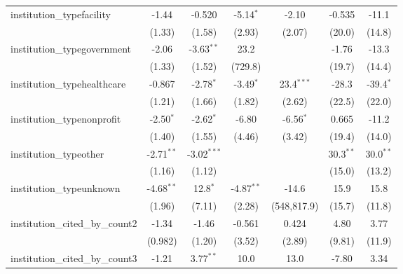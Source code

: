 \begin{tabular}{lcccccc}
   institution\_typefacility             & -1.44         & -0.520        & -5.14$^{*}$   & -2.10         & -0.535        & -11.1\\   
                                         & (1.33)        & (1.58)        & (2.93)        & (2.07)        & (20.0)        & (14.8)\\   
   institution\_typegovernment           & -2.06         & -3.63$^{**}$  & 23.2          &               & -1.76         & -13.3\\   
                                         & (1.33)        & (1.52)        & (729.8)       &               & (19.7)        & (14.4)\\   
   institution\_typehealthcare           & -0.867        & -2.78$^{*}$   & -3.49$^{*}$   & 23.4$^{***}$  & -28.3         & -39.4$^{*}$\\   
                                         & (1.21)        & (1.66)        & (1.82)        & (2.62)        & (22.5)        & (22.0)\\   
   institution\_typenonprofit            & -2.50$^{*}$   & -2.62$^{*}$   & -6.80         & -6.56$^{*}$   & 0.665         & -11.2\\   
                                         & (1.40)        & (1.55)        & (4.46)        & (3.42)        & (19.4)        & (14.0)\\   
   institution\_typeother                & -2.71$^{**}$  & -3.02$^{***}$ &               &               & 30.3$^{**}$   & 30.0$^{**}$\\   
                                         & (1.16)        & (1.12)        &               &               & (15.0)        & (13.2)\\   
   institution\_typeunknown              & -4.68$^{**}$  & 12.8$^{*}$    & -4.87$^{**}$  & -14.6         & 15.9          & 15.8\\   
                                         & (1.96)        & (7.11)        & (2.28)        & (548,817.9)   & (15.7)        & (11.8)\\   
   institution\_cited\_by\_count2        & -1.34         & -1.46         & -0.561        & 0.424         & 4.80          & 3.77\\   
                                         & (0.982)       & (1.20)        & (3.52)        & (2.89)        & (9.81)        & (11.9)\\   
   institution\_cited\_by\_count3        & -1.21         & 3.77$^{**}$   & 10.0          & 13.0          & -7.80         & 3.34\\   

\end{tabular}
